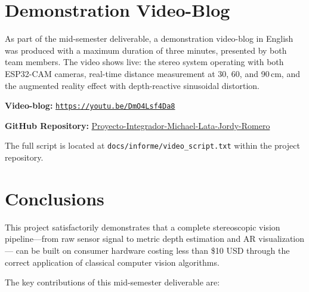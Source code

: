 \documentclass[12pt, a4paper]{article}
\begin{document}
\clearpage
\section{Demonstration Video-Blog}

As part of the mid-semester deliverable, a demonstration video-blog in English was
produced with a maximum duration of three minutes, presented by both team members.
The video shows live: the stereo system operating with both ESP32-CAM cameras, real-time
distance measurement at 30, 60, and 90\,cm, and the augmented reality effect with
depth-reactive sinusoidal distortion.

\begin{center}
\textbf{Video-blog:}\quad
\href{https://youtu.be/DmO4Lsf4Da8}{\texttt{https://youtu.be/DmO4Lsf4Da8}}

\medskip
\textbf{GitHub Repository:}\quad
\href{https://github.com/Whiteherobot/Proyecto-Integrador-Michael-Lata-Jordy-Romero}{Proyecto-Integrador-Michael-Lata-Jordy-Romero}
\end{center}

\noindent The full script is located at \texttt{docs/informe/video\_script.txt}
within the project repository.

\section{Conclusions}

This project satisfactorily demonstrates that a complete stereoscopic vision
pipeline---from raw sensor signal to metric depth estimation and AR visualization---
can be built on consumer hardware costing less than \$10 USD through the correct
application of classical computer vision algorithms.

The key contributions of this mid-semester deliverable are:
\end{document}
